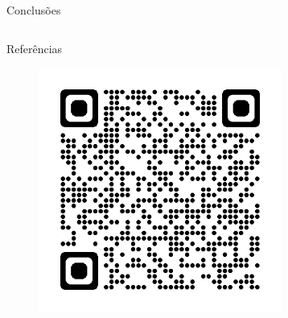 \documentclass[final]{beamer}
\newlength{\sepwidth}
\newlength{\colwidth}
\newcommand{\separatorcolumn}{\begin{column}{\sepwidth}\end{column}}
\begin{document}
\begin{frame}[t]
\begin{columns}[t]
\begin{column}{\colwidth}
\begin{exampleblock}{Conclusões}
\end{exampleblock}
%    
%    
%    
\end{column}
\separatorcolumn
\end{columns}
\begin{columns}[t]
\begin{column}{0.9328981723\paperwidth}
\begin{block}{Referências}
\begin{multicols}{2}
\begin{multicols}{3}
    \nocite{*}
    \scriptsize
    
    
\end{multicols}
    \hfill
    \begin{figure}
    \centering
  \vspace*{-1.45cm}\hfill\includegraphics[height=8cm]{images/qrcode2}
\end{figure}
%    
\end{multicols}
\end{block}
\end{column}
\end{columns}
\end{frame}
\end{document}
